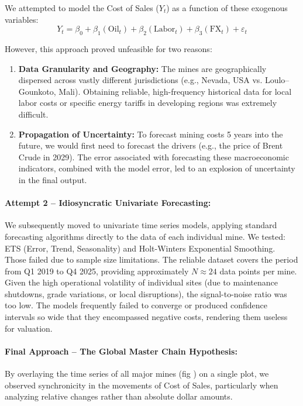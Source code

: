 We attempted to model the Cost of Sales ($Y_t$) as a function of these exogenous variables:
\[ Y_t = \beta_0 + \beta_1(\text{Oil}_t) + \beta_2(\text{Labor}_t) + \beta_3(\text{FX}_t) + \varepsilon_t \]

However, this approach proved unfeasible for two reasons:
\begin{enumerate}
    \item \textbf{Data Granularity and Geography:} The mines are geographically dispersed across vastly different jurisdictions (e.g., Nevada, USA vs. Loulo--Gounkoto, Mali). Obtaining reliable, high-frequency historical data for local labor costs or specific energy tariffs in developing regions was extremely difficult.
    \item \textbf{Propagation of Uncertainty:} To forecast mining costs 5 years into the future, we would first need to forecast the drivers (e.g., the price of Brent Crude in 2029). The error associated with forecasting these macroeconomic indicators, combined with the model error, led to an explosion of uncertainty in the final output.
\end{enumerate}

\paragraph{Attempt 2 -- Idiosyncratic Univariate Forecasting:}
We subsequently moved to univariate time series models, applying standard forecasting algorithms directly to the data of each individual mine. We tested: ETS (Error, Trend, Seasonality) and Holt-Winters Exponential Smoothing.\\
Those failed due to sample size limitations. The reliable dataset covers the period from Q1 2019 to Q4 2025, providing approximately $N \approx 24$ data points per mine. Given the high operational volatility of individual sites (due to maintenance shutdowns, grade variations, or local disruptions), the signal-to-noise ratio was too low. The models frequently failed to converge or produced confidence intervals so wide that they encompassed negative costs, rendering them useless for valuation.

\paragraph{Final Approach -- The Global Master Chain Hypothesis:}

By overlaying the time series of all major mines (fig ) on a single plot, we observed synchronicity in the movements of Cost of Sales, particularly when analyzing relative changes rather than absolute dollar amounts. 

